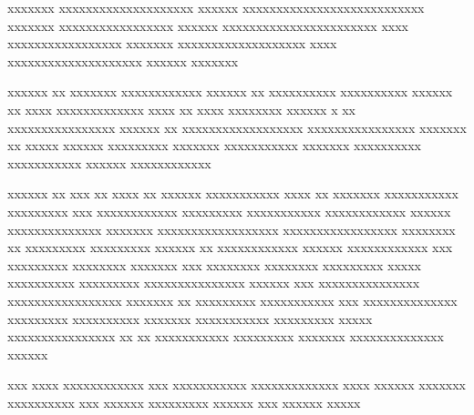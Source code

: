 \begin{preface}
xxxxxxx xxxxxxxxxxxxxxxxxxxx xxxxxx xxxxxxxxxxxxxxxxxxxxxxxxxxx xxxxxxx xxxxxxxxxxxxxxxxx xxxxxx xxxxxxxxxxxxxxxxxxxxxxx xxxx xxxxxxxxxxxxxxxxx xxxxxxx xxxxxxxxxxxxxxxxxxx xxxx xxxxxxxxxxxxxxxxxxxx xxxxxx xxxxxxx

xxxxxx xx xxxxxxx xxxxxxxxxxxx xxxxxx xx xxxxxxxxxx xxxxxxxxxx xxxxxx xx xxxx xxxxxxxxxxxxx xxxx xx xxxx xxxxxxxx xxxxxx x xx xxxxxxxxxxxxxxxx xxxxxx xx xxxxxxxxxxxxxxxxxx xxxxxxxxxxxxxxxx xxxxxxx xx xxxxx xxxxxx xxxxxxxxx xxxxxxx xxxxxxxxxxx xxxxxxx xxxxxxxxxx xxxxxxxxxxx xxxxxx xxxxxxxxxxxx

xxxxxx xx xxx xx xxxx xx xxxxxx xxxxxxxxxxx xxxx xx xxxxxxx xxxxxxxxxxx xxxxxxxxx xxx xxxxxxxxxxxx xxxxxxxxx xxxxxxxxxxx xxxxxxxxxxxx xxxxxx xxxxxxxxxxxxxx xxxxxxx xxxxxxxxxxxxxxxxxx xxxxxxxxxxxxxxxxx xxxxxxxx xx xxxxxxxxx xxxxxxxxx xxxxxx xx xxxxxxxxxxxx xxxxxx xxxxxxxxxxxx xxx xxxxxxxxx xxxxxxxx xxxxxxx xxx xxxxxxxx xxxxxxxx xxxxxxxxx xxxxx xxxxxxxxxx xxxxxxxxx xxxxxxxxxxxxxxx xxxxxx xxx xxxxxxxxxxxxxxx xxxxxxxxxxxxxxxxx xxxxxxx xx xxxxxxxxx xxxxxxxxxxx xxx xxxxxxxxxxxxxx xxxxxxxxx xxxxxxxxxx xxxxxxx xxxxxxxxxxx xxxxxxxxx xxxxx xxxxxxxxxxxxxxxx xx xx xxxxxxxxxxx xxxxxxxxx xxxxxxx xxxxxxxxxxxxxx xxxxxx

xxx xxxx xxxxxxxxxxxx xxx xxxxxxxxxxx xxxxxxxxxxxxx xxxx xxxxxx xxxxxxx xxxxxxxxxx xxx xxxxxx xxxxxxxxx xxxxxx xxx xxxxxx xxxxx
\end{preface}